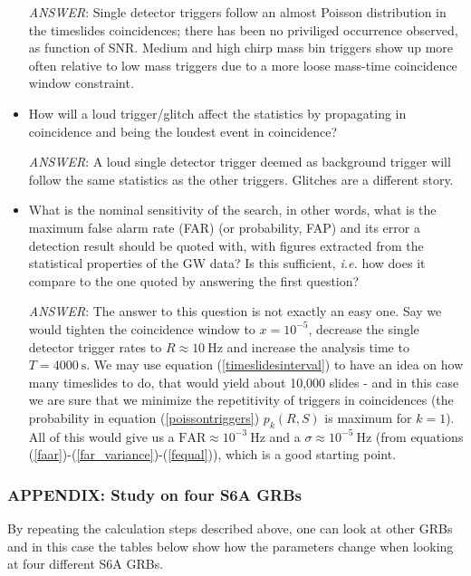 \documentclass[epsf]{article}
\begin{document}
\begin{itemize}
\emph{ANSWER}: Single detector triggers follow an almost Poisson distribution in the timeslides coincidences; there has been no priviliged occurrence observed, as function of SNR. Medium  and high chirp mass bin triggers show up more often relative to low mass triggers due to a more loose mass-time coincidence window constraint.

\item
How will a loud trigger/glitch affect the statistics by propagating in coincidence and being the loudest event in coincidence?

\emph{ANSWER}: A loud single detector trigger deemed as background trigger will follow the same statistics as the other triggers. Glitches are a different story.

\item
What is the nominal sensitivity of the search, in other words, what is the maximum false alarm rate (FAR) (or probability, FAP) and its error a detection result should be quoted with, with figures extracted from the statistical properties of the GW data? Is this sufficient, \emph{i.e.} how does it compare to the one quoted by answering the first question?

\emph{ANSWER}: The answer to this question is not exactly an easy one. Say we would tighten the coincidence window to $x=10^{-5}$, decrease the single detector trigger rates to $R \approx 10~\mathrm{Hz}$ and increase the analysis time to $T=4000~\mathrm{s}$. We may use equation (\ref{timeslidesinterval}) to have an idea on how many timeslides to do, that would yield about 10,000 slides - and in this case we are sure that we minimize the repetitivity of triggers in coincidences (the probability in equation (\ref{poissontriggers}) $p_k(R,S)$ is maximum for $k=1$). All of this would give us a $\mathrm{FAR} \approx 10^{-3}~\mathrm{Hz}$ and a $\sigma \approx 10^{-5}~\mathrm{Hz}$ (from equations (\ref{faar})-(\ref{far_variance})-(\ref{fequal})), which is a good starting point.

\end{itemize}


\subsubsection{APPENDIX: Study on four S6A GRBs}

By repeating the calculation steps described above, one can look at other GRBs and in this case the tables below show how the parameters change when looking at four different S6A GRBs.
\end{document}
